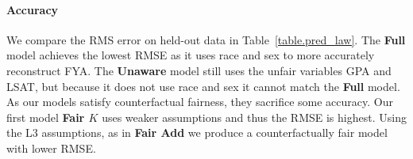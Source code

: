 


\paragraph{Accuracy}
We compare the RMS error on held-out data in Table~\ref{table.pred_law}.  The \textbf{Full} model achieves the lowest RMSE as it uses race and sex to more accurately reconstruct FYA. The \textbf{Unaware} model still uses the unfair variables GPA and LSAT, but because it does not use race and sex it cannot match the \textbf{Full} model. As our models satisfy counterfactual fairness, they sacrifice some accuracy. Our first model \textbf{Fair $K$} uses weaker assumptions and thus the RMSE is highest. Using the L3 assumptions, as in \textbf{Fair Add} we produce a counterfactually fair model with lower RMSE.


